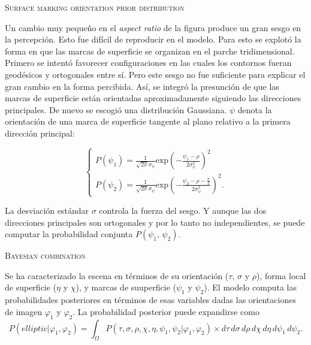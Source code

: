 \documentclass[a4paper,12pt]{article}
\begin{document}
{\scshape Surface marking orientation prior distribution}

Un cambio muy pequeño en el {\itshape aspect ratio} de la figura produce un gran sesgo en la percepción. Esto fue difícil de reproducir en el modelo. Para esto se explotó la forma en que las marcas de superficie se organizan en el parche tridimensional. Primero se intentó favorecer configuraciones en las cuales los contornos fueran geodésicos y ortogonales entre sí. Pero este sesgo no fue suficiente para explicar el gran cambio en la forma percibida. Así, se integró la presunción de que las marcas de superficie están orientadas aproximadamente siguiendo las direcciones principales. De nuevo se escogió una distribución Gaussiana. $\psi$ denota la orientación de una marca de superficie tangente al plano relativo a la primera dirección principal:

\begin{equation}
\left\{
	\begin{array}{l}
		P(\psi_{1})
		=
		\frac{
			1
		}{
		\sqrt{2\pi}\sigma_{\psi}
		}
		\mbox{exp}
		\left(
		-\frac{
			\psi_{1}-\rho
		}{
			2\sigma^{2}_{\psi}
		}
		\right)^{2}
		
		\\

		P(\psi_{2})
		=
		\frac{
			1
		}{
		\sqrt{2\pi}\sigma_{\psi}
		}
		\mbox{exp}
		\left(
		-\frac{
			\psi_{2} - \rho - \frac{\pi}{2}
		}{
			2\sigma_{\psi}^{2}
		}
		\right)^{2}.
	\end{array}	
\right.
\end{equation}

La desviación estándar $\sigma$ controla la fuerza del sesgo. Y aunque las dos direcciones principales son ortogonales y por lo tanto no independientes, se puede computar la probabilidad conjunta $P(\psi_{1},\, \psi_{2})$.

{\scshape Bayesian combination}

Se ha caracterizado la escena en términos de su orientación ($\tau$, $\sigma$ y $\rho$), forma local de superficie ($\eta$ y $\chi$), y marcas de suuperficie ($\psi_{1}$ y $\psi_{2}$). El modelo computa las probabilidades posteriores en términos de esas variables dadas las orientaciones de imagen $\varphi_{1}$ y $\varphi_{2}$. La probabilidad posterior puede expandirse como
\begin{equation}
		P(elliptic | \varphi_{1}, \varphi_{2})
		=
		\int_{\Omega}
		P(\tau,\sigma,\rho,\chi,\eta,\psi_{1},\psi_{2} | \varphi_{1}, \varphi_{2})
		\times
		d\tau\, d\sigma\, d\rho\, d\chi\, d\eta\, d\psi_{1}\, d\psi_{2}.
\end{equation}
\end{document}
